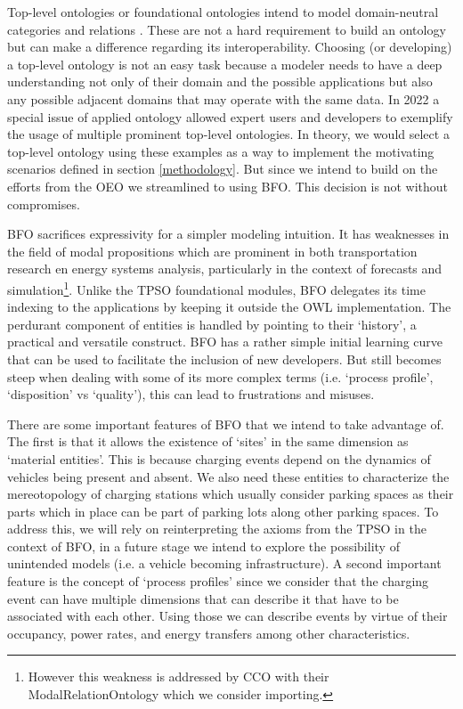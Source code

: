 Top-level ontologies or foundational ontologies intend to model domain-neutral
categories and relations \cite{Arp.2015}. These are not a hard requirement to
build an ontology but can make a difference regarding its interoperability.
Choosing (or developing) a top-level ontology is not an easy task because a
modeler needs to have a deep understanding not only of their domain and the
possible applications but also any possible adjacent domains that may operate
with the same data. In 2022 a special issue of applied ontology
\cite{Borgo.2022} allowed expert users and developers to exemplify the usage of
multiple prominent top-level ontologies. In theory, we would select a top-level
ontology using these examples as a way to implement the motivating scenarios
defined in section \ref{methodology}. But since we intend to build on the
efforts from the OEO we streamlined to using BFO. This decision is not without
compromises. 

BFO sacrifices expressivity for a simpler modeling intuition. It has weaknesses
in the field of modal propositions which are prominent in both transportation
research en energy systems analysis, particularly in the context of forecasts
and simulation\footnote{However this weakness is addressed by CCO with their
ModalRelationOntology which we consider importing. }. Unlike the TPSO
foundational modules, BFO delegates its time indexing to the applications by
keeping it outside the OWL implementation. The perdurant component of entities
is handled by pointing to their `history', a practical and versatile construct.
BFO has a rather simple initial learning curve that can be used to facilitate
the inclusion of new developers. But still becomes steep when dealing with some
of its more complex terms (i.e. `process profile', `disposition' vs `quality'),
this can lead to frustrations and misuses.

There are some important features of BFO that we intend to take advantage of.
The first is that it allows the existence of `sites' in the same dimension as
`material entities'. This is because charging events depend on the dynamics of
vehicles being present and absent. We also need these entities to characterize
the mereotopology of charging stations which usually consider parking spaces as
their parts which in place can be part of parking lots along other parking
spaces. To address this, we will rely on reinterpreting the axioms from the TPSO
in the context of BFO, in a future stage we intend to explore the possibility of
unintended models (i.e. a vehicle becoming infrastructure). A second important
feature is the concept of `process profiles' since we consider that the charging
event can have multiple dimensions that can describe it that have to be
associated with each other. Using those we can describe events by virtue of
their occupancy, power rates, and energy transfers among other characteristics.
